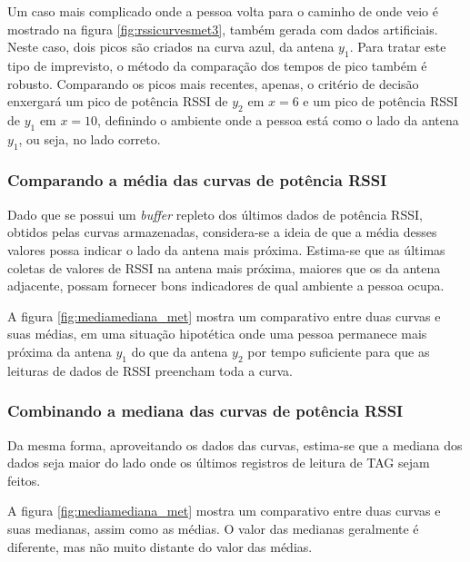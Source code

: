 Um caso mais complicado onde a pessoa volta para o caminho de onde veio é mostrado na figura \ref{fig:rssicurvesmet3}, também gerada com dados artificiais. Neste caso, dois picos são criados na curva azul, da antena $y_1$. Para tratar este tipo de imprevisto, o método da comparação dos tempos de pico também é robusto. Comparando os picos mais recentes, apenas, o critério de decisão enxergará um pico de potência RSSI de $y_2$ em $x=6$ e um pico de potência RSSI de $y_1$ em $x=10$, definindo o ambiente onde a pessoa está como o lado da antena $y_1$, ou seja, no lado correto.
 
\subsubsection{Comparando a média das curvas de potência RSSI} \label{section:mean_met}

 Dado que se possui um \textit{buffer} repleto dos últimos dados de potência RSSI, obtidos pelas curvas armazenadas, considera-se a ideia de que a média desses valores possa indicar o lado da antena mais próxima. Estima-se que as últimas coletas de valores de RSSI na antena mais próxima, maiores que os da antena adjacente, possam fornecer bons indicadores de qual ambiente a pessoa ocupa.
 
 A figura \ref{fig:mediamediana_met} mostra um comparativo entre duas curvas e suas médias, em uma situação hipotética onde uma pessoa permanece mais próxima da antena $y_1$ do que da antena $y_2$ por tempo suficiente para que as leituras de dados de RSSI preencham toda a curva.

\subsubsection{Combinando a mediana das curvas de potência RSSI} \label{section:median_met}
 
 Da mesma forma, aproveitando os dados das curvas, estima-se que a mediana dos dados seja maior do lado onde os últimos registros de leitura de TAG sejam feitos.
 
  A figura \ref{fig:mediamediana_met} mostra um comparativo entre duas curvas e suas medianas, assim como as médias. O valor das medianas geralmente é diferente, mas não muito distante do valor das médias.

